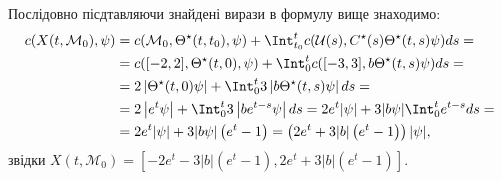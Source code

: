 \begin{solution}
    
    Послідовно пісдтавляючи знайдені вирази в формулу вище знаходимо:
    \begin{equation*}
    \begin{split}
        c(X(t, \mathcal{M}_0), \psi) &= c(\mathcal{M}_0, \Theta^\star(t, t_0), \psi) + \Int_{t_0}^t c(\mathcal{U}(s), C^\star(s) \Theta^\star(t, s)\psi) ds = \\
        &= c([-2,2], \Theta^\star(t, 0), \psi) + \Int_0^t c([-3, 3], b \Theta^\star(t, s)\psi) ds = \\
        &= 2\left|\Theta^\star(t, 0)\psi\right| + \Int_0^t 3\left|b \Theta^\star(t, s)\psi\right| ds = \\
        &= 2\left|e^t\psi\right| + \Int_0^t 3\left|b e^{t-s}\psi\right| ds = 2e^t|\psi| + 3|b \psi| \Int_0^t e^{t-s} ds = \\
        &= 2e^t|\psi| + 3|b \psi| \left(e^t - 1\right) = \left(2e^t + 3|b|\left(e^t - 1\right)\right) |\psi|,
    \end{split}
    \end{equation*}
    звідки $X(t, \mathcal{M}_0) = \left[-2e^t - 3|b|\left(e^t - 1\right), 2e^t + 3|b|\left(e^t - 1\right)\right]$.
\end{solution}